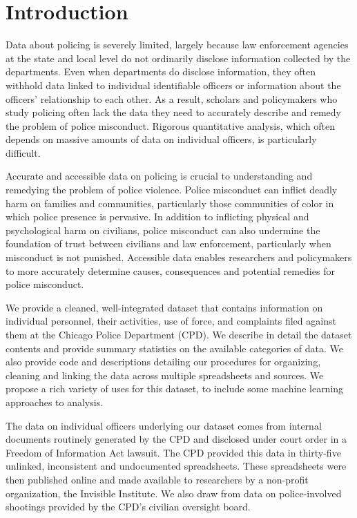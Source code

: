 

\section{Introduction} \label{sec:intro}

Data about policing is severely limited, largely because law enforcement
agencies at the state and local level do not ordinarily disclose information
collected by the departments. Even when departments do disclose information,
they often withhold data linked to individual identifiable officers or
information about the officers’ relationship to each other. As a result,
scholars and policymakers who study policing often lack the data they need to
accurately describe and remedy the problem of police misconduct. Rigorous
quantitative analysis, which often depends on massive amounts of data on
individual officers, is particularly difficult.

Accurate and accessible data on policing is crucial to understanding and
remedying the problem of police violence. Police misconduct can inflict deadly
harm on families and communities, particularly those communities of color in
which police presence is pervasive.  In addition to inflicting physical and
psychological harm on civilians, police misconduct can also undermine the
foundation of trust between civilians and law enforcement, particularly when
misconduct is not punished. Accessible data enables researchers and
policymakers to more accurately determine causes, consequences and potential
remedies for police misconduct.

We provide a cleaned, well-integrated dataset that contains information on
individual personnel, their activities, use of force, and complaints filed
against them at the Chicago Police Department (CPD). We describe in detail the
dataset contents and provide summary statistics on the available categories of
data. We also provide code and descriptions detailing our procedures for
organizing, cleaning and linking the data across multiple spreadsheets and
sources. We propose a rich variety of uses for this dataset, to include some
machine learning approaches to analysis.

The data on individual officers underlying our dataset comes from internal
documents routinely generated by the CPD and disclosed under court order in
a Freedom of Information Act lawsuit. The CPD provided this data in thirty-five
unlinked, inconsistent and undocumented spreadsheets. These spreadsheets were
then published online and made available to researchers by a non-profit
organization, the Invisible Institute. We also draw from data on
police-involved shootings provided by the CPD’s civilian oversight board.

